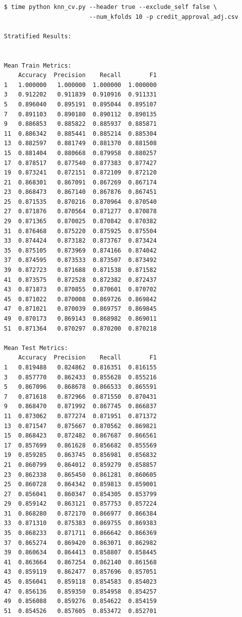 \begin{verbatim}
$ time python knn_cv.py --header true --exclude_self false \
                        --num_kfolds 10 -p credit_approval_adj.csv

Stratified Results:


Mean Train Metrics: 
    Accuracy  Precision    Recall        F1
1   1.000000   1.000000  1.000000  1.000000
3   0.912202   0.911839  0.910916  0.911331
5   0.896040   0.895191  0.895044  0.895107
7   0.891103   0.890180  0.890112  0.890135
9   0.886853   0.885822  0.885937  0.885871
11  0.886342   0.885441  0.885214  0.885304
13  0.882597   0.881749  0.881370  0.881508
15  0.881404   0.880668  0.879958  0.880257
17  0.878517   0.877540  0.877383  0.877427
19  0.873241   0.872151  0.872109  0.872120
21  0.868301   0.867091  0.867269  0.867174
23  0.868473   0.867140  0.867876  0.867451
25  0.871535   0.870216  0.870964  0.870540
27  0.871876   0.870564  0.871277  0.870878
29  0.871365   0.870025  0.870842  0.870382
31  0.876468   0.875220  0.875925  0.875504
33  0.874424   0.873182  0.873767  0.873424
35  0.875105   0.873969  0.874166  0.874042
37  0.874595   0.873533  0.873507  0.873492
39  0.872723   0.871688  0.871538  0.871582
41  0.873575   0.872528  0.872382  0.872437
43  0.871873   0.870855  0.870601  0.870702
45  0.871022   0.870008  0.869726  0.869842
47  0.871021   0.870039  0.869757  0.869845
49  0.870173   0.869143  0.868982  0.869011
51  0.871364   0.870297  0.870200  0.870218

Mean Test Metrics: 
    Accuracy  Precision    Recall        F1
1   0.819488   0.824862  0.816351  0.816155
3   0.857770   0.862433  0.855628  0.855216
5   0.867096   0.868678  0.866533  0.865591
7   0.871618   0.872966  0.871550  0.870431
9   0.868470   0.871992  0.867745  0.866837
11  0.873062   0.877274  0.871951  0.871372
13  0.871547   0.875667  0.870562  0.869821
15  0.868423   0.872482  0.867687  0.866561
17  0.857699   0.861628  0.856682  0.855569
19  0.859285   0.863745  0.856981  0.856832
21  0.860799   0.864012  0.859279  0.858857
23  0.862338   0.865450  0.861281  0.860605
25  0.860728   0.864342  0.859813  0.859001
27  0.856041   0.860347  0.854305  0.853799
29  0.859142   0.863121  0.857753  0.857224
31  0.868280   0.872170  0.866977  0.866384
33  0.871310   0.875383  0.869755  0.869383
35  0.868233   0.871711  0.866642  0.866369
37  0.865274   0.869420  0.863071  0.862982
39  0.860634   0.864413  0.858807  0.858445
41  0.863664   0.867254  0.862140  0.861568
43  0.859119   0.862477  0.857696  0.857051
45  0.856041   0.859118  0.854583  0.854023
47  0.856136   0.859350  0.854958  0.854257
49  0.856088   0.859276  0.854622  0.854159
51  0.854526   0.857605  0.853472  0.852701
\end{verbatim}


